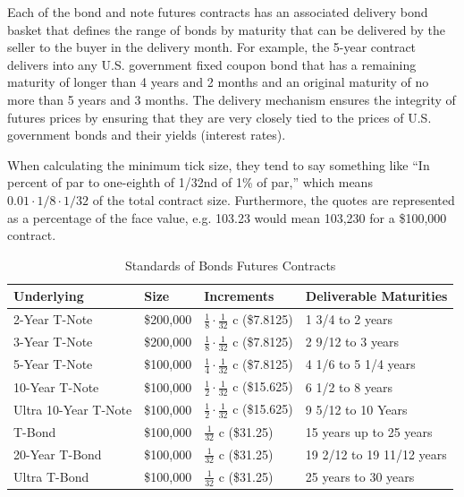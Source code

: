 \documentclass{article}
\begin{document}
      Each of the bond and note futures contracts has an associated delivery bond basket that defines the range of bonds by maturity that can be delivered by the seller to the buyer in the delivery month. For example, the 5-year contract delivers into any U.S. government fixed coupon bond that has a remaining maturity of longer than 4 years and 2 months and an original maturity of no more than 5 years and 3 months. The delivery mechanism ensures the integrity of futures prices by ensuring that they are very closely tied to the prices of U.S. government bonds and their yields (interest rates). 

      When calculating the minimum tick size, they tend to say something like ``In percent of par to one-eighth of 1/32nd of 1\% of par,'' which means $0.01 \cdot 1/8 \cdot 1/32$ of the total contract size. Furthermore, the quotes are represented as a percentage of the face value, e.g. 103.23 would mean 103,230 for a \$100,000 contract. 

      \begin{table}[H]
        \centering
        \begin{tabular}{|l|l|l|l|}
        \hline
        \textbf{Underlying} & \textbf{Size} & \textbf{Increments} & \textbf{Deliverable Maturities} \\ \hline
        2-Year T-Note & \$200,000 & $\frac{1}{8} \cdot \frac{1}{32}$ c (\$7.8125) & 1 3/4 to 2 years \\ \hline
        3-Year T-Note & \$200,000 & $\frac{1}{8} \cdot \frac{1}{32}$ c (\$7.8125) & 2 9/12 to 3 years \\ \hline
        5-Year T-Note & \$100,000 & $\frac{1}{4} \cdot \frac{1}{32}$ c (\$7.8125) & 4 1/6 to 5 1/4 years \\ \hline
        10-Year T-Note & \$100,000 & $\frac{1}{2} \cdot \frac{1}{32}$ c (\$15.625) & 6 1/2 to 8 years \\ \hline
        Ultra 10-Year T-Note & \$100,000 & $\frac{1}{2} \cdot \frac{1}{32}$ c (\$15.625) & 9 5/12 to 10 Years \\ \hline
        T-Bond & \$100,000 & $\frac{1}{32}$ c (\$31.25) & 15 years up to 25 years \\ \hline
        20-Year T-Bond & \$100,000 & $\frac{1}{32}$ c (\$31.25) & 19 2/12 to 19 11/12 years \\ \hline
        Ultra T-Bond & \$100,000 & $\frac{1}{32}$ c (\$31.25) & 25 years to 30 years \\ \hline
        \end{tabular}
        \caption{Standards of Bonds Futures Contracts}
        \label{tab:bonds}
      \end{table}
\end{document}
